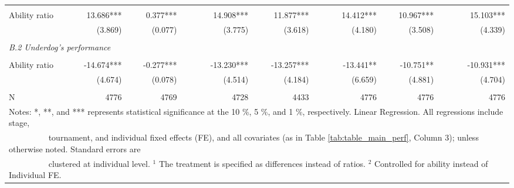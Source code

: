 \documentclass[11pt,a4paper]{article}
\begin{document}
\begin{landscape}
\begin{table}[H]
\begin{tabular}{l r r r r r r r r r r}
            \rule{0pt}{0.01ex}\\
			Ability ratio            & 13.686***   & 0.377*** & & 14.908***  & 11.877***  & & 14.412***  & 10.967***    & & 15.103***  \\
			                         & (3.869)     & (0.077)  & & (3.775)    & (3.618)   & & (4.180)    & (3.508)       & & (4.339) \\
            \rule{0pt}{0.3ex}\\
			\multicolumn{11}{l}{\textit{B.2 Underdog's performance}}  \\
            \rule{0pt}{0.01ex}\\
			Ability ratio            & -14.674*** & -0.277*** & & -13.230*** & -13.257*** & & -13.441** & -10.751**  & & -10.931***  \\
			                         & (4.674)    & (0.078)  & & (4.514)    & (4.184)    & & (6.659)   & (4.881)     & & (4.704)  \\
            \rule{0pt}{0.3ex}\\
			\midrule
			N                        &  4776    & 4769 & &  4728   & 4433 & &  4776 &  4776    & &   4776   \\ 
			\bottomrule \bottomrule
			\multicolumn{11}{l}{\footnotesize Notes: *, **, and *** represents statistical significance at the 10 \%, 5 \%, and 1 \%, respectively. Linear Regression. All regressions include stage,}\\
			\multicolumn{11}{l}{\footnotesize ~~~~~~~~~   tournament, and individual fixed effects (FE), and all covariates (as in Table \ref{tab:table_main_perf}, Column 3); unless otherwise noted. Standard errors are }\\
            \multicolumn{11}{l}{\footnotesize ~~~~~~~~~ clustered at individual level. $^1$ The treatment is specified as differences instead of ratios. $^2$ Controlled for ability instead of Individual FE.}
		\end{tabular}
	\end{table}

\end{landscape}
\end{document}
